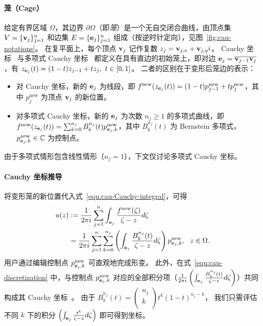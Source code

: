 \paragraph{笼（Cage）}
给定有界区域 $\Omega$，其边界 $\partial \Omega$（即\emph{笼}）是一个无自交闭合曲线，由顶点集 $V = \{\mathbf{v}_j\}^n_{j=1}$ 和边集 $E = \{\mathbf{e}_j\}^n_{j=1}$ 组成（按逆时针定向），见图~\ref{fig:cau-notations}。
%
在复平面上，每个顶点 $\mathbf{v}_j$ 记作复数 \(z_j=\mathbf{v}_{j,x}+\mathbf{v}_{j,y} i\)。
%
Cauchy 坐标~\cite{Weber2009} 与多项式 Cauchy 坐标~\cite{Lin2024PolynomialCC} 都定义在具有直边的初始笼上，即对边 $\mathbf{e}_j = \overline{\mathbf{v}_{j-1}\mathbf{v}_j}$，有 \( z_{\me_j}(t) = (1-t) z_{j-1} + t z_j,\ t\in[0,1]\)。
二者的区别在于变形后笼边的表示：
\begin{itemize}
    \item 对 Cauchy 坐标，新的 $\mathbf{e}_j$ 为线段，即 $f^\text{new}(z_{\mathbf{e}_j}(t)) = (1-t) p^\text{new}_{j-1}+t p^\text{new}_{j}$，其中 $p^\text{new}_{j}$ 为顶点 $\mathbf{v}_j$ 的新位置。
    \item 对多项式 Cauchy 坐标，新的 $\mathbf{e}_j$ 为次数 $n_j \geq 1$ 的多项式曲线，即 $f^\text{new}(z_{\mathbf{e}_j}(t)) = \sum_{k=0}^{n_j} B^{n_j}_k(t) p^\text{new}_{\mathbf{e}_j,k}$，其中 $B^{n_j}_k (t)$ 为 Bernstein 多项式，$p^\text{new}_{\mathbf{e}_j,k} \in \mathbb{C}$ 为控制点。
\end{itemize}
由于多项式情形包含线性情形（$n_j = 1$），下文仅讨论多项式 Cauchy 坐标。

\paragraph{Cauchy 坐标推导}
将变形笼的新位置代入式~\eqref{equ:cau-Cauchy-integral}，可得
\begin{equation}\label{equ:cau-discretization}
\begin{split}
    u(z) &:=\frac{1}{2\pi i} \sum_{j=1}^n \int_{\mathbf{e}_j}\frac{f^\text{new}(\zeta)}{\zeta-z}d\zeta \\
     &=\frac{1}{2 \pi i}\sum_{j=1}^n \sum_{k=0}^{n_j} \left(\int_{\mathbf{e}_j}\frac{B^{n_j}_k (t)}{\zeta-z}d\zeta\right) p^\text{new}_{\mathbf{e}_j,k}, \ \ z \in \Omega.
\end{split}
\end{equation}
用户通过编辑控制点 $p^\text{new}_{\mathbf{e}_j,k}$ 可直观地完成形变。
此外，在式~\eqref{equ:cau-discretization} 中，与控制点 $p^\text{new}_{\mathbf{e}_j,k}$ 对应的全部积分项（$\frac{1}{2 \pi i}\left(\int_{\mathbf{e}_j}\frac{B^{n_j}_k (t)}{\zeta-z}d\zeta\right)$）共同构成其 Cauchy 坐标~\cite{Lin2024PolynomialCC}。
由于 $B^{n_j}_k (t) = 
\begin{pmatrix}
n_j \\
k \\
\end{pmatrix}
t^k (1-t)^{n_j-k}$，
我们只需评估不同 $k$ 下的积分 $\left(\int_{\mathbf{e}_j}\frac{t^k}{\zeta-z}d\zeta\right)$ 即可得到坐标。

